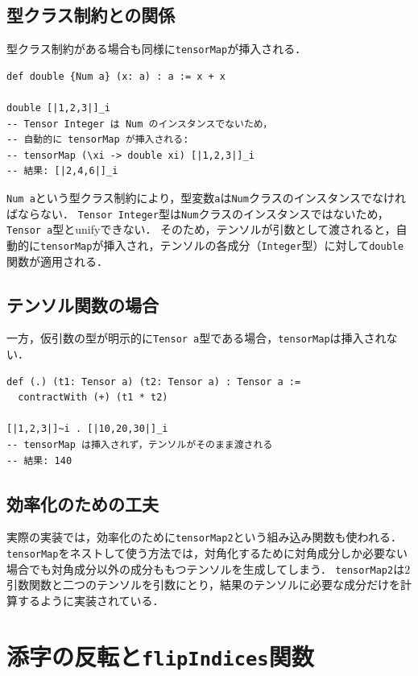 \subsection{型クラス制約との関係}

型クラス制約がある場合も同様に\lstinline{tensorMap}が挿入される．
\begin{lstlisting}[language=egison,numbers=none]
def double {Num a} (x: a) : a := x + x

double [|1,2,3|]_i
-- Tensor Integer は Num のインスタンスでないため，
-- 自動的に tensorMap が挿入される:
-- tensorMap (\xi -> double xi) [|1,2,3|]_i
-- 結果: [|2,4,6|]_i
\end{lstlisting}

\lstinline{Num a}という型クラス制約により，型変数\lstinline{a}は\lstinline{Num}クラスのインスタンスでなければならない．
\lstinline{Tensor Integer}型は\lstinline{Num}クラスのインスタンスではないため，\lstinline{Tensor a}型とunifyできない．
そのため，テンソルが引数として渡されると，自動的に\lstinline{tensorMap}が挿入され，テンソルの各成分（\lstinline{Integer}型）に対して\lstinline{double}関数が適用される．

\subsection{テンソル関数の場合}

一方，仮引数の型が明示的に\lstinline{Tensor a}型である場合，\lstinline{tensorMap}は挿入されない．
\begin{lstlisting}[language=egison,numbers=none]
def (.) (t1: Tensor a) (t2: Tensor a) : Tensor a :=
  contractWith (+) (t1 * t2)

[|1,2,3|]~i . [|10,20,30|]_i
-- tensorMap は挿入されず，テンソルがそのまま渡される
-- 結果: 140
\end{lstlisting}

\subsection{効率化のための工夫}

実際の実装では，効率化のために\lstinline{tensorMap2}という組み込み関数も使われる．
\lstinline{tensorMap}をネストして使う方法では，対角化するために対角成分しか必要ない場合でも対角成分以外の成分ももつテンソルを生成してしまう．
\lstinline{tensorMap2}は$2$引数関数と二つのテンソルを引数にとり，結果のテンソルに必要な成分だけを計算するように実装されている．

\section{添字の反転と\texttt{flipIndices}関数}

